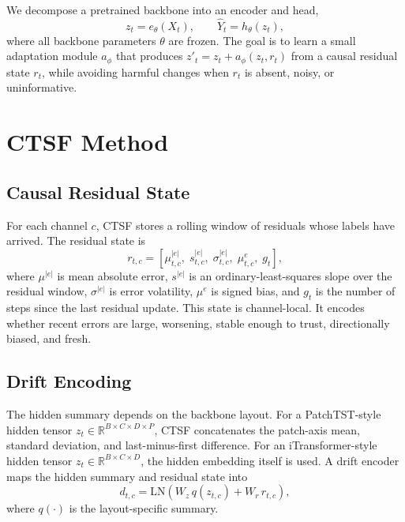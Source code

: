 \documentclass[10pt]{article}
\begin{document}
We decompose a pretrained backbone into an encoder and head,
\begin{equation}
    z_t = e_{\theta}(X_t), \qquad \hat{Y}_t = h_{\theta}(z_t),
\end{equation}
where all backbone parameters $\theta$ are frozen. The goal is to learn a small adaptation module $a_{\phi}$ that produces $z'_t = z_t + a_{\phi}(z_t, r_t)$ from a causal residual state $r_t$, while avoiding harmful changes when $r_t$ is absent, noisy, or uninformative.

\section{CTSF Method}
\subsection{Causal Residual State}
For each channel $c$, CTSF stores a rolling window of residuals whose labels have arrived. The residual state is
\begin{equation}
    r_{t,c} =
    [\mu_{t,c}^{|e|},\; s_{t,c}^{|e|},\; \sigma_{t,c}^{|e|},\; \mu_{t,c}^{e},\; g_t],
\end{equation}
where $\mu^{|e|}$ is mean absolute error, $s^{|e|}$ is an ordinary-least-squares slope over the residual window, $\sigma^{|e|}$ is error volatility, $\mu^{e}$ is signed bias, and $g_t$ is the number of steps since the last residual update. This state is channel-local. It encodes whether recent errors are large, worsening, stable enough to trust, directionally biased, and fresh.

\subsection{Drift Encoding}
The hidden summary depends on the backbone layout. For a PatchTST-style hidden tensor $z_t \in \mathbb{R}^{B \times C \times D \times P}$, CTSF concatenates the patch-axis mean, standard deviation, and last-minus-first difference. For an iTransformer-style hidden tensor $z_t \in \mathbb{R}^{B \times C \times D}$, the hidden embedding itself is used. A drift encoder maps the hidden summary and residual state into
\begin{equation}
    d_{t,c} = \mathrm{LN}(W_z\,q(z_{t,c}) + W_r\,r_{t,c}),
\end{equation}
where $q(\cdot)$ is the layout-specific summary.
\end{document}

